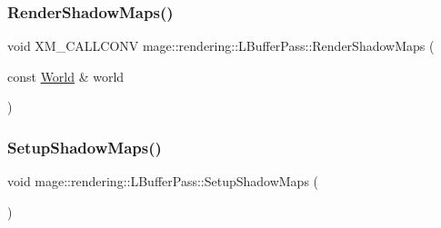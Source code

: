 \hypertarget{classmage_1_1rendering_1_1_l_buffer_pass_a811b69ff4df7d8a24a042a9677c4b67f}{}\label{classmage_1_1rendering_1_1_l_buffer_pass_a811b69ff4df7d8a24a042a9677c4b67f} 
\subsubsection{\texorpdfstring{Render\+Shadow\+Maps()}{RenderShadowMaps()}}
{\footnotesize\ttfamily void X\+M\+\_\+\+C\+A\+L\+L\+C\+O\+NV mage\+::rendering\+::\+L\+Buffer\+Pass\+::\+Render\+Shadow\+Maps (\begin{DoxyParamCaption}\item[{const \hyperlink{classmage_1_1rendering_1_1_world}{World} \&}]{world }\end{DoxyParamCaption})\hspace{0.3cm}{\ttfamily [private]}}

\hypertarget{classmage_1_1rendering_1_1_l_buffer_pass_a405734dad82467908e68217254e4f2ad}{}\label{classmage_1_1rendering_1_1_l_buffer_pass_a405734dad82467908e68217254e4f2ad} 
\subsubsection{\texorpdfstring{Setup\+Shadow\+Maps()}{SetupShadowMaps()}}
{\footnotesize\ttfamily void mage\+::rendering\+::\+L\+Buffer\+Pass\+::\+Setup\+Shadow\+Maps (\begin{DoxyParamCaption}{ }\end{DoxyParamCaption})\hspace{0.3cm}{\ttfamily [private]}}

\hypertarget{classmage_1_1rendering_1_1_l_buffer_pass_ac456e0612e540d215d8c709e705ade20}{}\label{classmage_1_1rendering_1_1_l_buffer_pass_ac456e0612e540d215d8c709e705ade20} 
